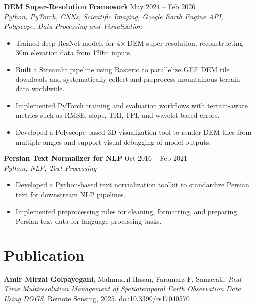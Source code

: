 \documentclass[a4paper,10pt]{article}
\begin{document}
\noindent
\textbf{DEM Super-Resolution Framework} \hfill May 2024 -- Feb 2026 \\
\textit{Python, PyTorch, CNNs, Scientific Imaging, Google Earth Engine API, Polyscope, Data Processing and Visualization}
\begin{itemize}[leftmargin=0.25in]
    \item Trained deep ResNet models for 4$\times$ DEM super-resolution, reconstructing 30m elevation data from 120m inputs.
    \item Built a Streamlit pipeline using Rasterio to parallelize GEE DEM tile downloads and systematically collect and preprocess mountainous terrain data worldwide.
    \item Implemented PyTorch training and evaluation workflows with terrain-aware metrics such as RMSE, slope, TRI, TPI, and wavelet-based errors.
    \item Developed a Polyscope-based 3D visualization tool to render DEM tiles from multiple angles and support visual debugging of model outputs.
\end{itemize}

\noindent
\textbf{Persian Text Normalizer for NLP} \hfill Oct 2016 -- Feb 2021 \\
\textit{Python, NLP, Text Processing}
\begin{itemize}[leftmargin=0.25in]
    \item Developed a Python-based text normalization toolkit to standardize Persian text for downstream NLP pipelines.
    \item Implemented preprocessing rules for cleaning, formatting, and preparing Persian text data for language-processing tasks.
\end{itemize}

\section*{Publication}

\textbf{Amir Mirzai Golpayegani}, Mahmudul Hasan, Faramarz F. Samavati. 
\textit{Real-Time Multiresolution Management of Spatiotemporal Earth Observation Data Using DGGS}. 
Remote Sensing, 2025. \href{https://doi.org/10.3390/rs17040570}{doi:10.3390/rs17040570}


\end{document}
